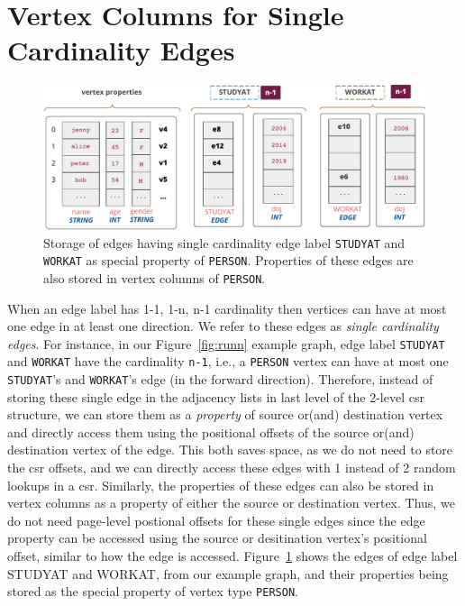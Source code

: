 \section{Vertex Columns for Single Cardinality Edges}
\label{sec:single-cardinality-cols}

\begin{figure}
	\hfill\includegraphics[scale=0.78]{img/single-cardinality-cols}\hspace*{\fill}
	\captionsetup{justification=centering}
	\caption{Storage of edges having single cardinality edge label \texttt{STUDYAT} and \texttt{WORKAT} as special property of \texttt{PERSON}. \hspace{\textwidth} Properties of these edges are also stored in vertex columns of \texttt{PERSON}.}
	\label{fig:single-cardinality-cols}
\end{figure}

When an edge label has 1-1, 1-n, n-1 cardinality then vertices can have at most one edge in at least one direction. We refer to these edges as {\em single cardinality edges}. For instance, in our Figure~\ref{fig:runn} example graph, edge label \texttt{STUDYAT} and \texttt{WORKAT} have the cardinality \texttt{n-1}, i.e., a \texttt{PERSON} vertex can have at most one \texttt{STUDYAT}'s and \texttt{WORKAT}'s edge (in the forward direction). Therefore, instead of storing these single edge in the adjacency lists in last level of the 2-level \gls{csr} structure, we can store them as a \emph{property} of source or(and) destination vertex and directly access them using the positional offsets of the source or(and) destination vertex of the edge. This both saves space, as we do not need to store the \gls{csr} offsets, and we can directly access these edges with 1 instead of 2 random lookups in a \gls{csr}. Similarly, the properties of these edges can also be stored in vertex columns as a property of either the source or destination vertex. Thus, we do not need page-level postional offsets for these single edges since the edge property can be accessed using the source or desitination vertex's positional offset, similar to how the edge is accessed. Figure~\ref{fig:single-cardinality-cols} shows the edges of edge label STUDYAT and WORKAT, from our example graph, and their properties being stored as the special property of vertex type \texttt{PERSON}.


